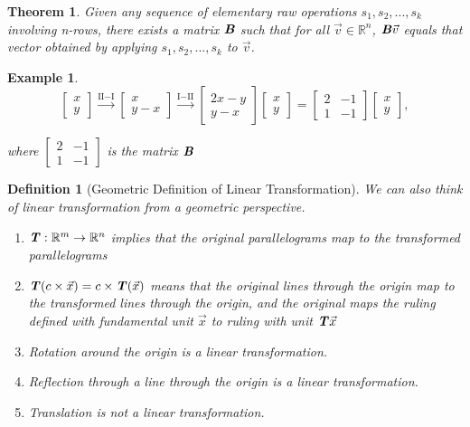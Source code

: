 \documentclass[12pt, a4paper]{article}
\newtheorem{thm}{Theorem}[subsection]
\newtheorem{df}{Definition}[subsection]
\newtheorem{eg}{Example}[subsection]
\def\R{{\mathbb{R}}}
\def\T{{\textbf{\emph{T}}}}
\def\matrixB{\textbf{\emph{B}}}
\begin{document}
\begin{thm}
Given any sequence of elementary raw operations $s_1, s_2,...,s_k$ involving n-rows, there exists a matrix $\matrixB$ such that for all $\vec{v}\in\R^n$, $\matrixB\vec{v}$ equals that vector obtained by applying $s_1, s_2,...,s_k$ to $\vec{v}$.
\end{thm}

\begin{eg}
$$\begin{bmatrix}x\\y\end{bmatrix}\xrightarrow[]{\text{II}-\text{I}}\begin{bmatrix}x\\y-x\end{bmatrix}\xrightarrow[]{\text{I}-\text{II}}\begin{bmatrix}2x-y\\y-x\end{bmatrix}\begin{bmatrix}x\\y\end{bmatrix}=\begin{bmatrix}2&-1\\1&-1\end{bmatrix}\begin{bmatrix}x\\y
\end{bmatrix},$$

where $\begin{bmatrix}2&-1\\1&-1\end{bmatrix}$ is the matrix $\matrixB$
\end{eg}

\begin{df}[Geometric Definition of Linear Transformation]
We can also think of linear transformation from a geometric perspective. 

\begin{enumerate}
\item $\T: \R^m\rightarrow\R^n$ implies that the original parallelograms map to the transformed parallelograms
\item $\T(c\times \vec{x})=c\times\T(\vec{x})$ means that the original lines through the origin map to the transformed lines through the origin, and the original maps the ruling defined with fundamental unit $\vec{x}$ to ruling with unit $\T\vec{x}$
\item Rotation around the origin is a linear transformation. 
\item Reflection through a line through the origin is a linear transformation.
\item Translation is not a linear transformation.
\end{enumerate}
\end{df}
\end{document}
